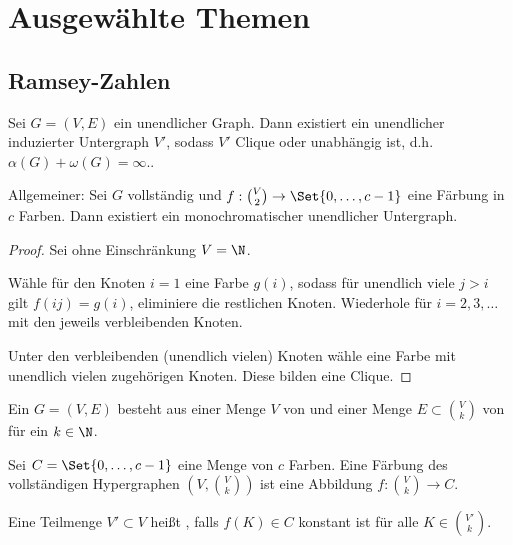 \chapter{Ausgewählte Themen}


\section{Ramsey-Zahlen}




\begin{st}
    Sei $G = (V,E)$ ein unendlicher Graph.
    Dann existiert ein unendlicher induzierter Untergraph $V'$, sodass $V'$ Clique oder unabhängig ist, d.h. $\alpha(G) + \omega(G) = \infty.$.

    Allgemeiner:
    Sei $G$ vollständig und $f: \binom{V}{2} \to \Set{0, \dotsc, c - 1}$ eine Färbung in $c$ Farben.
    Dann existiert ein monochromatischer unendlicher Untergraph.
    \begin{proof}
        Sei ohne Einschränkung $V = \N$.

        Wähle für den Knoten $i = 1$ eine Farbe $g(i)$, sodass für unendlich viele $j > i$ gilt $f(ij) = g(i)$, eliminiere die restlichen Knoten.
        Wiederhole für $i = 2, 3, \dotsc$ mit den jeweils verbleibenden Knoten.

        Unter den verbleibenden (unendlich vielen) Knoten wähle eine Farbe mit unendlich vielen zugehörigen Knoten.
        Diese bilden eine Clique.
    \end{proof}
\end{st}

\begin{df}
    Ein  $G = (V, E)$ besteht aus einer Menge $V$ von  und einer Menge $E \subset \binom{V}{k}$ von  für ein $k \in \N$.

    Sei $C = \Set{0, \dotsc, c-1}$ eine Menge von $c$ Farben.
    Eine Färbung des vollständigen Hypergraphen $(V, \binom{V}{k})$ ist eine Abbildung $f: \binom{V}{k} \to C$.

    Eine Teilmenge $V' \subset V$ heißt , falls $f(K) \in C$ konstant ist für alle $K \in \binom{V'}{k}$.
\end{df}

